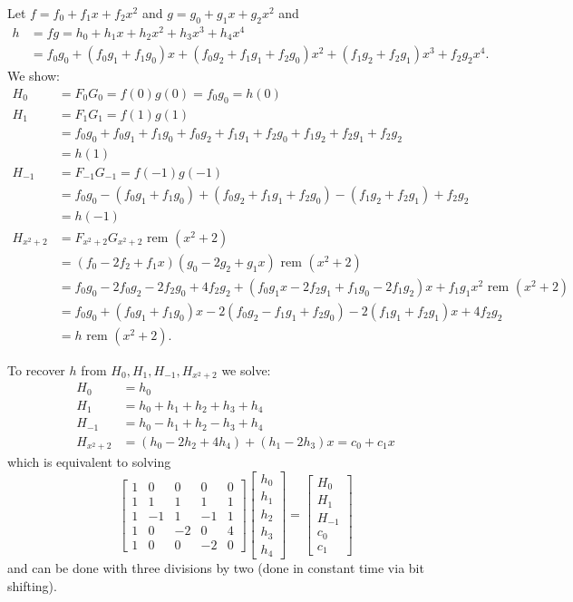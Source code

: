 \documentclass[12pt]{report}
\newcommand{\rem}{\text{ rem }}
\begin{document}
Let $f = f_0 + f_1 x + f_2x^2$ and $g= g_0 + g_1 x + g_2 x^2$ and 
\begin{align*}
h &= fg = h_0 + h_1x + h_2x^2 + h_3x^3 + h_4 x^4 \\
&= f_0 g_0 + (f_0 g_1 + f_1 g_0)x + (f_0 g_2 + f_1g_1 + f_2g_0)x^2 + (f_1g_2 + f_2g_1)x^3 + f_2g_2 x^4.
\end{align*}
We show:
\begin{align*}
H_0 &= F_0G_0 = f(0)g(0) = f_0 g_0 = h(0) \\
H_1 &= F_1G_1 = f(1)g(1) \\
&= f_0 g_0 + f_0 g_1 + f_1 g_0 + f_0 g_2 + f_1g_1 + f_2g_0 + f_1g_2 + f_2g_1 + f_2g_2\\  
&= h(1) \\
H_{-1} &= F_{-1}G_{-1} = f(-1)g(-1) \\
&= f_0 g_0 - (f_0 g_1 + f_1 g_0) + (f_0 g_2 + f_1g_1 + f_2g_0) - (f_1g_2 + f_2g_1) + f_2g_2\\ 
&= h(-1) \\
H_{x^2+2} &= F_{x^2+2}G_{x^2+2} \rem (x^2 + 2) \\
&= ( f_0-2f_2 + f_1x)(g_0-2g_2+g_1x) \rem (x^2+2)\\
&= f_0g_0 - 2f_0g_2 -2f_2g_0 +4f_2g_2 + (f_0g_1x-2f_2g_1+f_1g_0-2f_1g_2)x+f_1g_1x^2 \rem(x^2+2)\\
&= f_0g_0+(f_0g_1+f_1g_0)x -2 (f_0g_2 -f_1g_1 +f_2g_0) -2(f_1g_1+f_2g_1)x + 4f_2g_2 \\
&=h \rem (x^2+2).
\end{align*}


To recover $h$ from $H_0, H_1, H_{-1}, H_{x^2+2}$ we solve:
\begin{align*}
H_0 &= h_0 \\
H_1 &= h_0 + h_1 + h_2 + h_3 + h_4 \\
H_{-1} &= h_0 - h_1 + h_2 - h_3 + h_4 \\
H_{x^2+2} &= (h_0 - 2h_2 + 4h_4) + (h_1-2h_3)x = c_0 + c_1x
\end{align*}
which is equivalent to solving 
$$\left[\begin{array}{rrrrr}1 & 0 & 0 & 0 & 0 \\1 & 1 & 1 & 1 & 1 \\1 & -1 & 1 & -1 & 1 \\1 & 0 & -2 & 0 & 4 \\1 & 0 & 0 & -2 & 0\end{array}\right]\left[\begin{array}{c}h_0 \\h_1 \\h_2 \\h_3 \\h_4\end{array}\right]=\left[\begin{array}{l}H_0 \\H_1 \\H_{-1} \\c_0 \\c_1\end{array}\right]$$
and can be done with three divisions by two (done in constant time via bit shifting).
\end{document}
